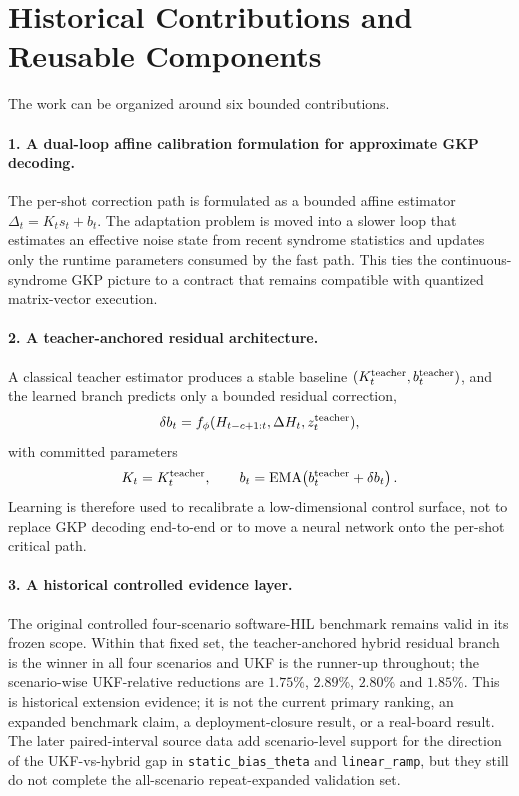 \documentclass[11pt]{article}
\begin{document}
\section{Historical Contributions and Reusable Components}

The work can be organized around six bounded contributions.

\paragraph{1. A dual-loop affine calibration formulation for approximate GKP
decoding.}
The per-shot correction path is formulated as a bounded affine estimator
\(\Delta_t=K_t s_t+b_t\).  The adaptation problem is moved into a slower loop
that estimates an effective noise state from recent syndrome statistics and
updates only the runtime parameters consumed by the fast path.  This ties the
continuous-syndrome GKP picture to a contract that remains compatible with
quantized matrix-vector execution.

\paragraph{2. A teacher-anchored residual architecture.}
A classical teacher estimator produces a stable baseline
\((K_t^{\rm teacher},b_t^{\rm teacher})\), and the learned branch predicts only
a bounded residual correction,
\begin{equation}
    \delta b_t=f_\phi(H_{t-c+1:t},\Delta H_t,z_t^{\rm teacher}),
\end{equation}
with committed parameters
\begin{equation}
    K_t=K_t^{\rm teacher}, \qquad
    b_t={\rm EMA}\!\left(b_t^{\rm teacher}+\delta b_t\right).
\end{equation}
Learning is therefore used to recalibrate a low-dimensional control surface,
not to replace GKP decoding end-to-end or to move a neural network onto the
per-shot critical path.

\paragraph{3. A historical controlled evidence layer.}
The original controlled four-scenario software-HIL benchmark remains valid in
its frozen scope.  Within that fixed set, the
teacher-anchored hybrid residual branch is the winner in all four scenarios
and UKF is the runner-up throughout; the scenario-wise UKF-relative reductions
are \(1.75\%\), \(2.89\%\), \(2.80\%\) and \(1.85\%\).  This is historical
extension evidence; it is not the current primary ranking, an expanded
benchmark claim, a deployment-closure result, or a real-board result.  The
later paired-interval source data add
scenario-level support for the direction of the UKF-vs-hybrid gap in
\texttt{static\_bias\_theta} and \texttt{linear\_ramp}, but they still do not
complete the all-scenario repeat-expanded validation set.
\end{document}
